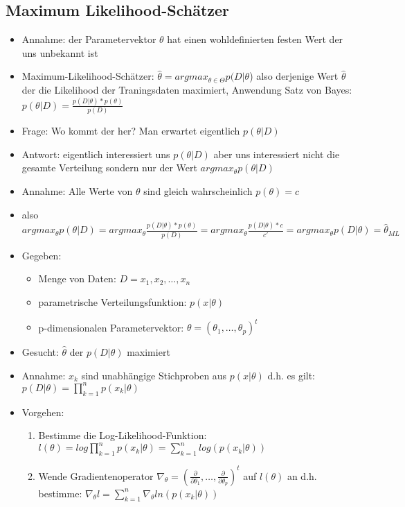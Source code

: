 \documentclass{article} %
\begin{document}
	\subsection{Maximum Likelihood-Schätzer}
	\begin{itemize}
		\item Annahme: der Parametervektor $\theta$ hat einen wohldefinierten festen Wert der uns unbekannt ist
		\item Maximum-Likelihood-Schätzer: $\hat{\theta} = argmax_{\theta \in \Theta} p(D|\theta$) also derjenige Wert $\hat{\theta}$ der die Likelihood der Traningsdaten maximiert, Anwendung Satz von Bayes: $p(\theta|D) = \frac{p(D|\theta)*p(\theta)}{p(D)}$
		\item Frage: Wo kommt der her? Man erwartet eigentlich $p(\theta|D)$
		\item Antwort: eigentlich interessiert uns $p(\theta|D)$ aber uns interessiert nicht die gesamte Verteilung sondern nur der Wert $argmax_\theta p(\theta|D)$
		\item Annahme: Alle Werte von $\theta$ sind gleich wahrscheinlich $p(\theta) = c$
		\item also $argmax_\theta p(\theta|D) = argmax_\theta \frac{p(D|\theta)*p(\theta)}{p(D)} = argmax_\theta \frac{p(D|\theta)*c}{c'} = argmax_\theta p(D|\theta) = \hat{\theta}_{ML}$
		\item Gegeben:
		\begin{itemize}
			\item Menge von Daten: $D = x_1,x_2,\dots,x_n$
			\item parametrische Verteilungsfunktion: $p(x|\theta)$
			\item p-dimensionalen Parametervektor: $\theta = (\theta_1,\dots,\theta_p)^t$
		\end{itemize}
		\item Gesucht: $\hat{\theta}$ der $p(D|\theta)$ maximiert
		\item Annahme: $x_k$ sind unabhängige Stichproben aus $p(x|\theta)$ d.h. es gilt: $p(D|\theta) = \prod_{k=1}^{n}p(x_k|\theta)$
		\item Vorgehen:
		\begin{enumerate}
			\item Bestimme die Log-Likelihood-Funktion: $l(\theta) = log \prod_{k=1}^{n}p(x_k|\theta) = \sum_{k=1}^{n}log(p(x_k|\theta))$
			\item Wende Gradientenoperator $\nabla_\theta = (\frac{\partial}{\partial \theta_1},\dots,\frac{\partial}{\partial \theta_p})^t$ auf $l(\theta)$ an d.h. bestimme: $\nabla_\theta l = \sum_{k=1}^{n} \nabla_\theta ln(p(x_k|\theta))$

\end{enumerate}
\end{itemize}
\end{document}
